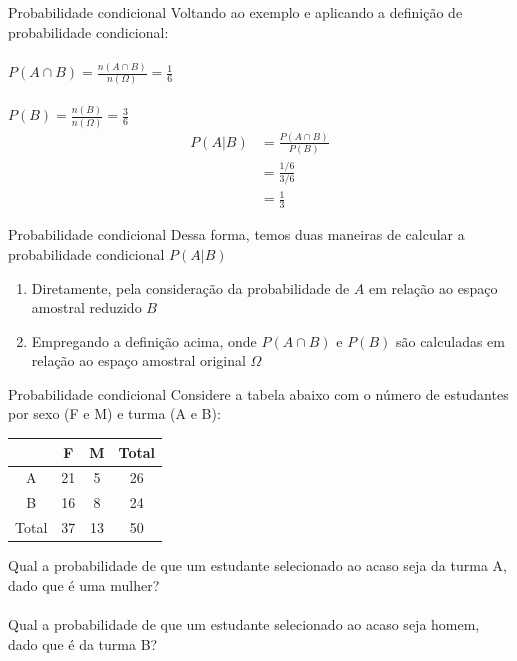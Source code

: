 \documentclass[10pt]{beamer}\usepackage[]{graphicx}\usepackage[]{color}
\theoremstyle{definition}
\begin{document}
\begin{frame}{Probabilidade condicional}
  Voltando ao exemplo e aplicando a definição de probabilidade
  condicional: \\~\\
  $P(A \cap B) = \frac{n(A \cap B)}{n(\Omega)} = \frac{1}{6}$ \\~\\
  $P(B) = \frac{n(B)}{n(\Omega)} = \frac{3}{6}$
  \vspace{1em}
  \begin{align*}
    P(A|B) &= \frac{P(A \cap B)}{P(B)} \\
     &= \frac{1/6}{3/6} \\
     &= \frac{1}{3}
  \end{align*}
\end{frame}

\begin{frame}{Probabilidade condicional}
  Dessa forma, temos duas maneiras de calcular a probabilidade
  condicional $P(A|B)$
  \begin{enumerate}
  \item Diretamente, pela consideração da probabilidade de $A$ em
    relação ao espaço amostral reduzido $B$
  \item Empregando a definição acima, onde $P(A \cap B)$ e $P(B)$ são
    calculadas em relação ao espaço amostral original $\Omega$
  \end{enumerate}
\end{frame}

\begin{frame}{Probabilidade condicional}
  Considere a tabela abaixo com o número de estudantes por sexo (F e M)
  e turma (A e B):
  \begin{table}
    \centering
    \begin{tabular}{c|cc|c}
      \hline
      & F & M & Total \\
      \hline
      A & 21 & 5 & 26 \\
      B & 16 & 8 & 24 \\
      \hline
      Total & 37 & 13 & 50 \\
      \hline
    \end{tabular}
  \end{table}
  Qual a probabilidade de que um estudante selecionado ao acaso seja da
  turma A, dado que é uma mulher? \\~\\
  Qual a probabilidade de que um estudante selecionado ao acaso seja
  homem, dado que é da turma B?
\end{frame}
\end{document}
